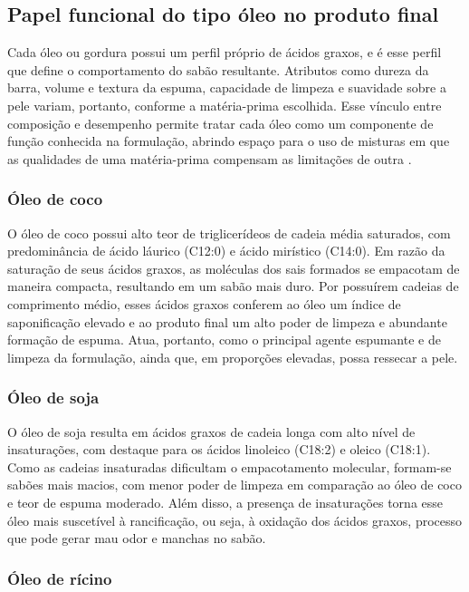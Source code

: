 \subsection{Papel funcional do tipo óleo no produto final}

Cada óleo ou gordura possui um perfil próprio de ácidos graxos, e é esse perfil que define o comportamento do sabão resultante. Atributos como dureza da barra, volume e textura da espuma, capacidade de limpeza e suavidade sobre a pele variam, portanto, conforme a matéria-prima escolhida. Esse vínculo entre composição e desempenho permite tratar cada óleo como um componente de função conhecida na formulação, abrindo espaço para o uso de misturas em que as qualidades de uma matéria-prima compensam as limitações de outra \cite{araujo2015valorizacao}.

\subsubsection{Óleo de coco}

O óleo de coco possui alto teor de triglicerídeos de cadeia média saturados, com predominância de ácido láurico (C12:0) e ácido mirístico (C14:0). Em razão da saturação de seus ácidos graxos, as moléculas dos sais formados se empacotam de maneira compacta, resultando em um sabão mais duro. Por possuírem cadeias de comprimento médio, esses ácidos graxos conferem ao óleo um índice de saponificação elevado e ao produto final um alto poder de limpeza e abundante formação de espuma. Atua, portanto, como o principal agente espumante e de limpeza da formulação, ainda que, em proporções elevadas, possa ressecar a pele.

\subsubsection{Óleo de soja}

O óleo de soja resulta em ácidos graxos de cadeia longa com alto nível de insaturações, com destaque para os ácidos linoleico (C18:2) e oleico (C18:1). Como as cadeias insaturadas dificultam o empacotamento molecular, formam-se sabões mais macios, com menor poder de limpeza em comparação ao óleo de coco e teor de espuma moderado. Além disso, a presença de insaturações torna esse óleo mais suscetível à rancificação, ou seja, à oxidação dos ácidos graxos, processo que pode gerar mau odor e manchas no sabão.

\subsubsection{Óleo de rícino}

